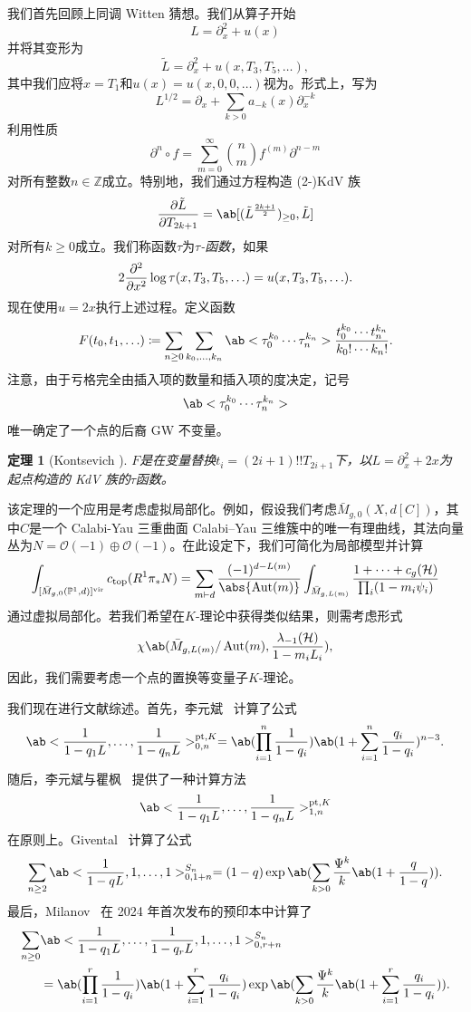 \documentclass{amsart}
\newtheorem{thm}{定理}[section]
\theoremstyle{definition}
\theoremstyle{remark}
\theoremstyle{plain}
\theoremstyle{definition}
\theoremstyle{remark}
\newcommand{\Z}{\mathbb{Z}}
\renewcommand{\P}{\mathbb{P}}
\newcommand{\mc}[1]{\mathcal{#1}}
\newcommand{\mr}[1]{\mathrm{#1}}
\newcommand{\1}{\mathbf{1}}
\newcommand{\2}{\mathbf{2}}
\newcommand{\3}{\mathbf{3}}
\newcommand{\vir}{\mr{vir}}
\DeclareMathOperator{\Aut}{Aut}
\begin{document}
我们首先回顾上同调 Witten 猜想。我们从算子开始
\[ L = \partial_x^2 + u(x) \]
并将其变形为
\[ \tilde{L} = \partial_x^2 + u(x, T_3, T_5, \ldots), \]
其中我们应将\(x = T_1\)和\(u(x) = u(x, 0, 0,\ldots)\)视为。形式上，写为
\[ L^{1/2} = \partial_x + \sum_{k > 0} a_{-k}(x) \partial_x^{-k} \]
利用性质
\[ \partial^n \circ f = \sum_{m = 0}^{\infty} \binom{n}{m} f^{(m)} \partial^{n-m} \]
对所有整数\(n \in \Z\)成立。特别地，我们通过方程构造 (2-)KdV 族
\[ \pdv{\tilde{L}}{T_{2k+1}} = \ab[(\tilde{L}^{\frac{2k+1}{2}})_{\geq 0}, \tilde{L}] \]
对所有\(k \geq 0\)成立。我们称函数\(\tau\)为\textit{\(\tau\)-函数}，如果
\[ 2 \pdv[2]{}{x}\log \tau(x, T_3, T_5, \ldots) = u(x, T_3, T_5, \ldots). \]
现在使用\(u = 2x\)执行上述过程。定义函数
\[ F(t_0, t_1, \ldots) \coloneqq \sum_{n \geq 0} \sum_{k_0, \ldots, k_n} \ab<\tau_0^{k_0} \cdots \tau_n^{k_n}> \frac{t_0^{k_0} \cdots t_n^{k_n}}{k_0! \cdots k_n!}. \]
注意，由于亏格完全由插入项的数量和插入项的度决定，记号
\[ \ab<\tau_0^{k_0} \cdots \tau_n^{k_n}> \]
唯一确定了一个点的后裔 GW 不变量。

\begin{thm}[Kontsevich {\cite{Kontsevich1992}}]
\(F\)是在变量替换\(t_i = (2i+1)!! T_{2i+1}\)下，以\(L = \partial_x^2 + 2x\)为起点构造的 KdV 族的\(\tau\)函数。
\end{thm}

该定理的一个应用是考虑虚拟局部化。例如，假设我们考虑\(\bar{M}_{g,0}(X, d[C])\)，其中\(C\)是一个 Calabi-Yau 三重曲面 Calabi--Yau 三维簇中的唯一有理曲线，其法向量丛为\(N = \mc{O}(-1)\oplus \mc{O}(-1)\)。在此设定下，我们可简化为局部模型并计算
\begin{align*}
    \int_{[\bar{M}_{g,0}(\P^1, d)]^{\vir}} c_{\mr{top}}(R^1 \pi_* N) = \sum_{m \vdash d} \frac{(-1)^{d-L(m)}}{\abs{\Aut(m)}} \int_{\bar{M}_{g, L(m)}} \frac{1 + \cdots + c_g(\mc{H})}{\prod_i (1-m_i \psi_i)}
\end{align*}
通过虚拟局部化。若我们希望在\(K\)-理论中获得类似结果，则需考虑形式
\[ \chi\ab(\bar{M}_{g, L(m)}/\Aut(m), \frac{\lambda_{-1}(\mc{H})}{1-m_i L_i}), \]
因此，我们需要考虑一个点的置换等变量子\(K\)-理论。

我们现在进行文献综述。首先，李元斌~\cite{Lee1997} 计算了公式
\[ \ab<\frac{1}{1-q_1 L}, \ldots, \frac{1}{1-q_n L}>_{0,n}^{\mr{pt}, K} = \ab(\prod_{i=1}^n \frac{1}{1-q_i}) \ab(1 + \sum_{i=1}^n \frac{q_i}{1-q_i})^{n-3}. \]
随后，李元斌与瞿枫~\cite{LeeQu2014} 提供了一种计算方法
\[ \ab<\frac{1}{1-q_1 L}, \ldots, \frac{1}{1-q_n L}>_{1,n}^{\mr{pt}, K} \]
在原则上。Givental~\cite{Givental2017K1} 计算了公式
\[ \sum_{n \geq 2} \ab<\frac{1}{1-q L}, 1, \ldots, 1>_{0,1+n}^{S_n} = (1-q) \exp\ab(\sum_{k > 0} \frac{\Psi^k}{k} \ab(1 + \frac{q}{1-q})). \]
最后，Milanov~\cite{Milanov2025} 在 2024 年首次发布的预印本中计算了
\begin{align*}
    \sum_{n \geq 0}& \ab<\frac{1}{1-q_1 L}, \ldots, \frac{1}{1-q_r L}, 1, \ldots, 1>_{0,r+n}^{S_n} \\
    &= \ab(\prod_{i=1}^{r} \frac{1}{1-q_i})\ab(1 + \sum_{i=1}^r \frac{q_i}{1-q_i}) \exp\ab(\sum_{k > 0} \frac{\Psi^k}{k} \ab(1 + \sum_{i=1}^r \frac{q_i}{1-q_i})). 
\end{align*}
\end{document}
